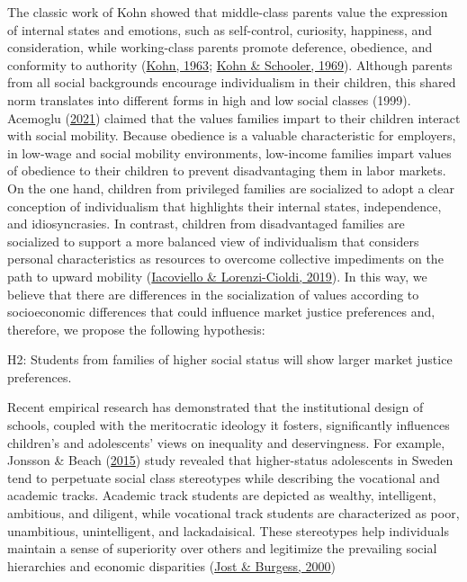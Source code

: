 \documentclass[
  letterpaper,
  DIV=11,
  numbers=noendperiod]{scrartcl}
\begin{document}
The classic work of Kohn showed that middle-class parents value the
expression of internal states and emotions, such as self-control,
curiosity, happiness, and consideration, while working-class parents
promote deference, obedience, and conformity to authority
(\protect\hyperlink{ref-kohn_social_1963}{Kohn, 1963};
\protect\hyperlink{ref-kohn_class_1969}{Kohn \& Schooler, 1969}).
Although parents from all social backgrounds encourage individualism in
their children, this shared norm translates into different forms in high
and low social classes (1999). Acemoglu
(\protect\hyperlink{ref-acemoglu_obedience_2021}{2021}) claimed that the
values families impart to their children interact with social mobility.
Because obedience is a valuable characteristic for employers, in
low-wage and social mobility environments, low-income families impart
values of obedience to their children to prevent disadvantaging them in
labor markets. On the one hand, children from privileged families are
socialized to adopt a clear conception of individualism that highlights
their internal states, independence, and idiosyncrasies. In contrast,
children from disadvantaged families are socialized to support a more
balanced view of individualism that considers personal characteristics
as resources to overcome collective impediments on the path to upward
mobility
(\protect\hyperlink{ref-iacoviello_collectivism_2019}{Iacoviello \&
Lorenzi-Cioldi, 2019}). In this way, we believe that there are
differences in the socialization of values according to socioeconomic
differences that could influence market justice preferences and,
therefore, we propose the following hypothesis:

H2: Students from families of higher social status will show larger
market justice preferences.

Recent empirical research has demonstrated that the institutional design
of schools, coupled with the meritocratic ideology it fosters,
significantly influences children's and adolescents' views on inequality
and deservingness. For example, Jonsson \& Beach
(\protect\hyperlink{ref-jonsson_institutional_2015}{2015}) study
revealed that higher-status adolescents in Sweden tend to perpetuate
social class stereotypes while describing the vocational and academic
tracks. Academic track students are depicted as wealthy, intelligent,
ambitious, and diligent, while vocational track students are
characterized as poor, unambitious, unintelligent, and lackadaisical.
These stereotypes help individuals maintain a sense of superiority over
others and legitimize the prevailing social hierarchies and economic
disparities (\protect\hyperlink{ref-jost_attitudinal_2000}{Jost \&
Burgess, 2000})
\end{document}
